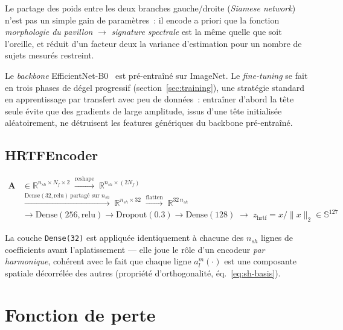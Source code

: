 \documentclass[12pt, a4paper]{article}
\begin{document}
Le partage des poids entre les deux branches gauche/droite (\textit{Siamese
network}) n'est pas un simple gain de paramètres~: il encode a priori que
la fonction \textit{morphologie du pavillon} $\to$ \textit{signature
spectrale} est la même quelle que soit l'oreille, et réduit d'un facteur
deux la variance d'estimation pour un nombre de sujets mesurés restreint.

Le \textit{backbone} EfficientNet-B0~\cite{Tan19} est pré-entraîné sur
ImageNet. Le \textit{fine-tuning} se fait en trois phases de dégel
progressif (section~\ref{sec:training}), une stratégie standard en
apprentissage par transfert avec peu de données~: entraîner d'abord la tête
seule évite que des gradients de large amplitude, issus d'une tête
initialisée aléatoirement, ne détruisent les features génériques du
backbone pré-entraîné.

\subsection{HRTFEncoder}

\begin{equation}
\begin{aligned}
    \mathbf{A} &\in \mathbb{R}^{n_{sh}\times N_f \times 2}
    \;\xrightarrow{\text{reshape}}\;
    \mathbb{R}^{n_{sh}\times (2N_f)} \\
    &\xrightarrow{\mathrm{Dense}(32,\mathrm{relu})\ \text{partagé sur } n_{sh}}\;
    \mathbb{R}^{n_{sh}\times 32}
    \;\xrightarrow{\text{flatten}}\;
    \mathbb{R}^{32\, n_{sh}} \\
    &\to \mathrm{Dense}(256,\mathrm{relu}) \to \mathrm{Dropout}(0.3)
        \to \mathrm{Dense}(128)
    \;\to\; z_{\mathrm{hrtf}} = x/\lVert x\rVert_2 \in \mathbb{S}^{127}
\end{aligned}
\end{equation}

La couche \texttt{Dense(32)} est appliquée identiquement à chacune des
$n_{sh}$ lignes de coefficients avant l'aplatissement — elle joue le rôle
d'un encodeur \emph{par harmonique}, cohérent avec le fait que chaque ligne
$a_l^m(\cdot)$ est une composante spatiale décorrélée des autres (propriété
d'orthogonalité, éq.~\eqref{eq:sh-basis}).

\section{Fonction de perte}
\label{sec:loss}
\end{document}
